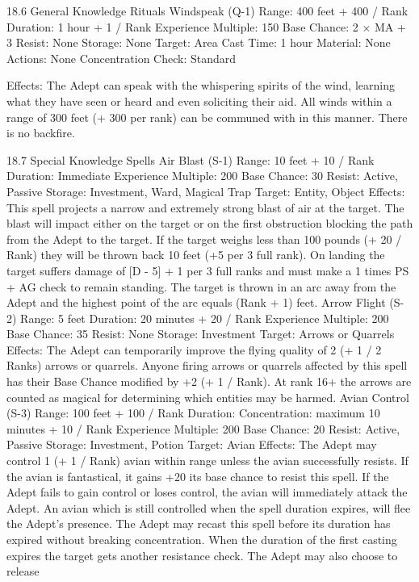 \documentclass[a4paper]{article}
\begin{document}
\begin{multicols}{3}
18.6 General Knowledge Rituals
Windspeak (Q-1)
Range: 400 feet + 400 / Rank
Duration: 1 hour + 1 / Rank
Experience Multiple: 150
Base Chance: 2 × MA + 3%
Resist: None
Storage: None
Target: Area
Cast Time: 1 hour
Material: None
Actions: None
Concentration Check: Standard

Effects: The Adept can speak with the whispering
spirits of the wind, learning what they have seen or
heard and even soliciting their aid. All winds
within a range of 300 feet (+ 300 per rank) can be
communed with in this manner. There is no backfire.

18.7 Special Knowledge Spells
Air Blast (S-1)
Range: 10 feet + 10 / Rank
Duration: Immediate
Experience Multiple: 200
Base Chance: 30%
Resist: Active, Passive
Storage: Investment, Ward, Magical Trap
Target: Entity, Object
Effects: This spell projects a narrow and extremely
strong blast of air at the target. The blast will impact either on the target or on the first obstruction
blocking the path from the Adept to the target. If
the target weighs less than 100 pounds (+ 20 /
Rank) they will be thrown back 10 feet (+5 per 3
full rank). On landing the target suffers damage of
[D - 5] + 1 per 3 full ranks and must make a 1
times PS + AG check to remain standing. The
target is thrown in an arc away from the Adept and
the highest point of the arc equals (Rank + 1) feet.
Arrow Flight (S-2)
Range: 5 feet
Duration: 20 minutes + 20 / Rank
Experience Multiple: 200
Base Chance: 35%
Resist: None
Storage: Investment
Target: Arrows or Quarrels
Effects: The Adept can temporarily improve the
flying quality of 2 (+ 1 / 2 Ranks) arrows or quarrels. Anyone firing arrows or quarrels affected by
this spell has their Base Chance modified by +2%
(+ 1 / Rank). At rank 16+ the arrows are counted as
magical for determining which entities may be
harmed.
Avian Control (S-3)
Range: 100 feet + 100 / Rank
Duration: Concentration: maximum 10 minutes +
10 / Rank
Experience Multiple: 200
Base Chance: 20%
Resist: Active, Passive
Storage: Investment, Potion
Target: Avian
Effects: The Adept may control 1 (+ 1 / Rank)
avian within range unless the avian successfully
resists. If the avian is fantastical, it gains +20%
its base chance to resist this spell. If the Adept fails
to gain control or loses control, the avian will
immediately attack the Adept. An avian which is
still controlled when the spell duration expires, will
flee the Adept’s presence. The Adept may recast
this spell before its duration has expired without
breaking concentration. When the duration of the
first casting expires the target gets another resistance check. The Adept may also choose to release

\end{multicols}
\end{document}
